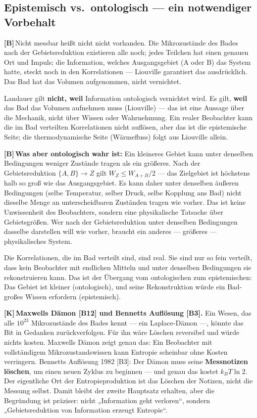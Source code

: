 \documentclass[11pt,a4paper]{article}
\newcommand{\LK}{\textcolor{layK}{\textbf{\footnotesize\textsf{[K]}}}\,}
\newcommand{\LB}{\textcolor{layB}{\textbf{\footnotesize\textsf{[B]}}}\,}
\begin{document}
\subsection{Epistemisch vs.\ ontologisch --- ein notwendiger Vorbehalt}

\LB Nicht messbar heißt nicht nicht vorhanden. Die Mikrozustände des Bades nach
der Gebietsreduktion existieren alle noch; jedes Teilchen hat einen genauen Ort
und Impuls; die Information, welches Ausgangsgebiet (A oder B) das System hatte,
steckt noch in den Korrelationen --- Liouville garantiert das ausdrücklich. Das
Bad hat das Volumen aufgenommen, nicht vernichtet.

Landauer gilt \textbf{nicht, weil} Information ontologisch vernichtet wird. Es
gilt, \textbf{weil} das Bad das Volumen aufnehmen muss (Liouville) --- das ist
eine Aussage über die Mechanik, nicht über Wissen oder Wahrnehmung. Ein realer
Beobachter kann die im Bad verteilten Korrelationen nicht auflösen, aber das ist
die epistemische Seite; die thermodynamische Seite (Wärmefluss) folgt aus
Liouville allein.

\LB \textbf{Was aber ontologisch wahr ist:} Ein kleineres Gebiet kann unter
denselben Bedingungen weniger Zustände tragen als ein größeres. Nach der
Gebietsreduktion $\{A,B\} \to Z$ gilt $W_Z \le W_{A+B}/2$ --- das Zielgebiet ist
höchstens halb so groß wie das Ausgangsgebiet. Es kann daher unter denselben
äußeren Bedingungen (selbe Temperatur, selber Druck, selbe Kopplung ans Bad) nicht
dieselbe Menge an unterscheidbaren Zuständen tragen wie vorher. Das ist keine
Unwissenheit des Beobachters, sondern eine physikalische Tatsache über
Gebietsgrößen. Wer nach der Gebietsreduktion unter denselben Bedingungen dasselbe
darstellen will wie vorher, braucht ein anderes --- größeres --- physikalisches
System.

Die Korrelationen, die im Bad verteilt sind, sind real. Sie sind nur so fein
verteilt, dass kein Beobachter mit endlichen Mitteln und unter denselben
Bedingungen sie rekonstruieren kann. Das ist der Übergang vom ontologischen zum
epistemischen: Das Gebiet ist kleiner (ontologisch), und seine Rekonstruktion
würde ein Bad-großes Wissen erfordern (epistemisch).

\LK \textbf{Maxwells Dämon [B12] und Bennetts Auflösung [B3].} Ein Wesen, das alle
$10^{23}$ Mikrozustände des Bades kennt --- ein Laplace-Dämon ---, könnte das Bit
in Gedanken zurückverfolgen. Für ihn wäre Löschen reversibel und würde nichts
kosten. Maxwells Dämon zeigt genau das: Ein Beobachter mit vollständigem
Mikrozustandswissen kann Entropie scheinbar ohne Kosten verringern. Bennetts
Auflösung 1982 [B3]: Der Dämon muss seine \textbf{Messnotizen löschen}, um einen
neuen Zyklus zu beginnen --- und genau das kostet $k_B T \ln 2$. Der eigentliche
Ort der Entropieproduktion ist das Löschen der Notizen, nicht die Messung selbst.
Damit bleibt der zweite Hauptsatz erhalten, aber die Begründung ist präziser:
nicht „Information geht verloren“, sondern „Gebietsreduktion von Information
erzeugt Entropie“.
\end{document}
